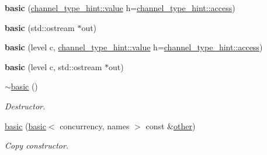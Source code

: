 \begin{DoxyCompactItemize}
\item 
\mbox{\label{classwebsocketpp_1_1log_1_1basic_a161725427aab2220743211512156810e}} 
{\bfseries basic} (\mbox{\hyperlink{structwebsocketpp_1_1log_1_1channel__type__hint_ad12a7f6555b71aabdc4cbec604dc89dd}{channel\+\_\+type\+\_\+hint\+::value}} h=\mbox{\hyperlink{structwebsocketpp_1_1log_1_1channel__type__hint_a8c38587fffbffbfcfc35577734b0d653}{channel\+\_\+type\+\_\+hint\+::access}})
\item 
\mbox{\label{classwebsocketpp_1_1log_1_1basic_ad1ba9e1e73f035b527f7cbcde6ceb709}} 
{\bfseries basic} (std\+::ostream $\ast$out)
\item 
\mbox{\label{classwebsocketpp_1_1log_1_1basic_aa38b56b9985927e20e54ff618b23409f}} 
{\bfseries basic} (level c, \mbox{\hyperlink{structwebsocketpp_1_1log_1_1channel__type__hint_ad12a7f6555b71aabdc4cbec604dc89dd}{channel\+\_\+type\+\_\+hint\+::value}} h=\mbox{\hyperlink{structwebsocketpp_1_1log_1_1channel__type__hint_a8c38587fffbffbfcfc35577734b0d653}{channel\+\_\+type\+\_\+hint\+::access}})
\item 
\mbox{\label{classwebsocketpp_1_1log_1_1basic_a43ccea903a0da548beace831b8629a1a}} 
{\bfseries basic} (level c, std\+::ostream $\ast$out)
\item 
\mbox{\label{classwebsocketpp_1_1log_1_1basic_ae2070dee0da9ae3ccf0833b59e51eca8}} 
\mbox{\hyperlink{classwebsocketpp_1_1log_1_1basic_ae2070dee0da9ae3ccf0833b59e51eca8}{$\sim$basic}} ()
\begin{DoxyCompactList}\small\item\em Destructor. \end{DoxyCompactList}\item 
\mbox{\label{classwebsocketpp_1_1log_1_1basic_ace381224e7990da5f3ec7505109fa541}} 
\mbox{\hyperlink{classwebsocketpp_1_1log_1_1basic_ace381224e7990da5f3ec7505109fa541}{basic}} (\mbox{\hyperlink{classwebsocketpp_1_1log_1_1basic}{basic}}$<$ concurrency, names $>$ const \&\mbox{\hyperlink{structother}{other}})
\begin{DoxyCompactList}\small\item\em Copy constructor. \end{DoxyCompactList}\item 

\end{DoxyCompactItemize}
